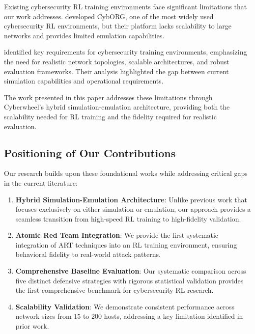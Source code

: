 Existing cybersecurity RL training environments face significant limitations that our work addresses. \citet{standen2021cyborg} developed CybORG, one of the most widely used cybersecurity RL environments, but their platform lacks scalability to large networks and provides limited emulation capabilities.

\citet{molina2021network} identified key requirements for cybersecurity training environments, emphasizing the need for realistic network topologies, scalable architectures, and robust evaluation frameworks. Their analysis highlighted the gap between current simulation capabilities and operational requirements.

The work presented in this paper addresses these limitations through Cyberwheel's hybrid simulation-emulation architecture, providing both the scalability needed for RL training and the fidelity required for realistic evaluation.

\subsection{Positioning of Our Contributions}

Our research builds upon these foundational works while addressing critical gaps in the current literature:

\begin{enumerate}
    \item \textbf{Hybrid Simulation-Emulation Architecture}: Unlike previous work that focuses exclusively on either simulation or emulation, our approach provides a seamless transition from high-speed RL training to high-fidelity validation.
    
    \item \textbf{Atomic Red Team Integration}: We provide the first systematic integration of ART techniques into an RL training environment, ensuring behavioral fidelity to real-world attack patterns.
    
    \item \textbf{Comprehensive Baseline Evaluation}: Our systematic comparison across five distinct defensive strategies with rigorous statistical validation provides the first comprehensive benchmark for cybersecurity RL research.
    
    \item \textbf{Scalability Validation}: We demonstrate consistent performance across network sizes from 15 to 200 hosts, addressing a key limitation identified in prior work.
\end{enumerate}

